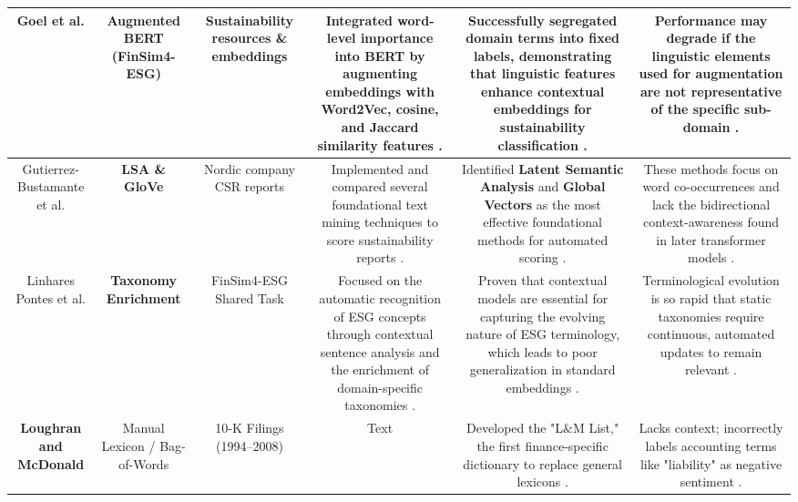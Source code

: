 \documentclass{article}
\begin{document}
\begin{table}[h!]
\begin{tabular}{|c|c|c|c|c|c|}
Goel et al.  \parencite{tushar_goel_31dfeaa9} & \textbf{Augmented BERT} (FinSim4-ESG) & Sustainability resources \& embeddings  \parencite{tushar_goel_31dfeaa9} & Integrated word-level importance into BERT by augmenting embeddings with \textbf{Word2Vec}, cosine, and Jaccard similarity features  \parencite{tushar_goel_31dfeaa9}. & Successfully segregated domain terms into fixed labels, demonstrating that linguistic features enhance contextual embeddings for sustainability classification  \parencite{tushar_goel_31dfeaa9}. & Performance may degrade if the linguistic elements used for augmentation are not representative of the specific sub-domain  \parencite{tushar_goel_31dfeaa9}. \\ \hline
Gutierrez-Bustamante et al.  \parencite{marcelo_gutierrez_bustamante_3c245ef4} & \textbf{LSA \& GloVe} & Nordic company CSR reports  \parencite{marcelo_gutierrez_bustamante_3c245ef4} & Implemented and compared several foundational text mining techniques to score sustainability reports  \parencite{marcelo_gutierrez_bustamante_3c245ef4}. & Identified \textbf{Latent Semantic Analysis} and \textbf{Global Vectors} as the most effective foundational methods for automated scoring  \parencite{marcelo_gutierrez_bustamante_3c245ef4}. & These methods focus on word co-occurrences and lack the bidirectional context-awareness found in later transformer models  \parencite{keane_ong_2746d04f}. \\ \hline
Linhares Pontes et al.  \parencite{elvys_linhares_pontes_34aa8658} & \textbf{Taxonomy Enrichment} & FinSim4-ESG Shared Task  \parencite{elvys_linhares_pontes_34aa8658} & Focused on the automatic recognition of ESG concepts through contextual sentence analysis and the enrichment of domain-specific taxonomies  \parencite{elvys_linhares_pontes_34aa8658}. & Proven that contextual models are essential for capturing the evolving nature of ESG terminology, which leads to poor generalization in standard embeddings  \parencite{elvys_linhares_pontes_34aa8658}. & Terminological evolution is so rapid that static taxonomies require continuous, automated updates to remain relevant  \parencite{elvys_linhares_pontes_34aa8658}. \\ \hline
\textbf{Loughran and McDonald} & Manual Lexicon / Bag-of-Words  \parencite{ting_sun_31d37ceb} & 10-K Filings (1994–2008)  \parencite{ting_sun_31d37ceb} & Text & Developed the "L\&M List," the first finance-specific dictionary to replace general lexicons  \parencite[]{sean_cao_9289d46c, ting_sun_31d37ceb}. & Lacks context; incorrectly labels accounting terms like "liability" as negative sentiment  \parencite{sean_cao_9289d46c}. \\ \hline

\end{tabular}
\end{table}
\end{document}
